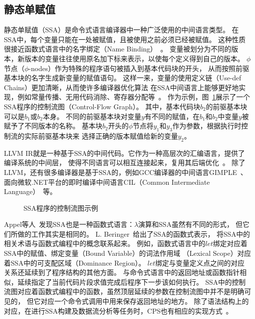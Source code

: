\subsection{静态单赋值} \label{sec:bg_ssa}

静态单赋值（SSA）是命令式语言编译器中一种广泛使用的中间语言类型。
在SSA中，每个变量只能在一处被赋值，且被使用之前必须已经被赋值。
这种性质很接近函数式语言中的名字绑定（Name Binding）~\cite{ssabook}。
变量被划分为不同的版本，新版本的变量往往使用原名加下标来表示，以使每个定义得到自己的版本。
$\phi$节点（$\phi$-nodes）作为特殊的程序语句被插入到基本代码块的开头，
从而按照前驱基本块的名字生成新变量的赋值语句。
这样一来，变量的使用定义链（Use-def Chains）更加清晰，从而使许多编译器优化算法
在SSA中间语言上能够更好地实现，例如常量传播、无用代码消除、寄存器分配等~\cite{ssabook,kelsey1995correspondence}。
作为示例，图~\ref{ssacfg}展示了一个SSA程序的控制流图（Control-Flow Graph）。
其中，基本代码块$b_2$的前驱基本块可以是$b_1$或$b_2$本身。
不同的前驱基本块对变量$y$有不同的赋值，在$b_1$和$b_2$中变量$y$被赋予了不同版本的名称。
基本块$b_2$开头的$\phi$节点将$y_1$和$y_3$作为参数，根据执行时控制流的实际前驱基本块来
选择正确的版本赋值给新的变量$y_2$。

LLVM IR就是一种基于SSA的中间代码。它作为一种高层次的汇编语言，提供了编译系统的中间层，
使得不同语言可以相互连接起来，复用其后端优化~\cite{lattner2006introduction}。
除了LLVM，还有很多编译器是基于SSA的，例如GCC编译器的中间语言GIMPLE~\cite{callanan2007extending}、
面向微软.NET平台的即时编译中间语言CIL（Common Intermediate Language）~\cite{thai2003net}等。

\begin{figure}[htbp]
    \centering
    
    \caption{SSA程序的控制流图示例}\label{ssacfg}
\end{figure}

Appel等人~\cite{appel1998ssa}发现SSA也是一种函数式语言：$\lambda$演算和SSA虽然有不同的形式，
但它们所做的工作其实是相同的。
L. Beringer~\cite{ssabook}给出了SSA的函数式表示，
将SSA中的相关术语与函数式编程中的概念联系起来。
例如，函数式语言中的$let$绑定对应着SSA中的赋值、绑定变量（Bound Variable）的词法作用域
（Lexical Scope）对应着SSA中的可支配区域（Dominance Region）。
$let$绑定与变量定义点之间的对应关系还延续到了程序结构的其他方面。
与命令式语言中的返回地址或函数指针相似，延续指定了当前代码片段求值完成后程序下一步该如何执行。
SSA中的控制流图对应着函数式编程中的函数，虽然顶层延续的参数在控制流图中并不是明确可见的，
但它对应一个命令式调用中用来保存返回地址的地方。
除了语法结构上的对应，在进行SSA构建及数据流分析等任务时，CPS也有相应的实现方式~\cite{Beringer2022}。

